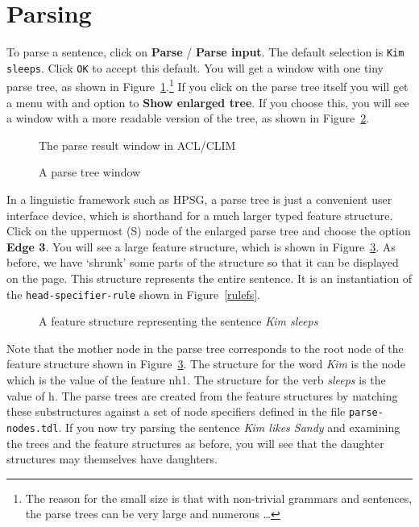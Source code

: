 \documentclass[12pt]{report}
\begin{document}
\section{Parsing}

To parse a sentence, click on {\bf Parse} / {\bf Parse input}.
The default selection is {\tt Kim sleeps}.  Click {\tt OK} to
accept this default. You will get a window with one tiny parse
tree, as shown in Figure~\ref{kimsleeps}.\footnote{The reason for the
small size is that with non-trivial grammars and sentences, the parse 
trees can be very large and numerous \ldots} If you click on the parse
tree itself you will get a menu with and option to {\bf Show enlarged tree}.
If you choose this, you will see a window with a more readable version
of the tree, as shown in Figure~\ref{ptree}.
\begin{figure}
\epsfxsize=2in
\caption{The parse result window in ACL/CLIM}
\label{kimsleeps}
\end{figure}
\begin{figure}
\epsfxsize=2in
\caption{A parse tree window}
\label{ptree}
\end{figure}

In a linguistic framework such as HPSG, a parse tree is just a convenient
user interface device, which is shorthand for a much larger typed
feature structure.  Click on the uppermost (S) node of the
enlarged parse tree and choose the option {\bf Edge 3}.  You will
see a large feature structure, which is shown in Figure~\ref{bigfs}.
As before, we have `shrunk' some parts of the structure so that
it can be displayed on the page.
This structure represents the entire
sentence.  It is an instantiation of the {\tt head-specifier-rule}
shown in Figure~\ref{rulefs}.
\begin{figure}
\epsfxsize=4in
\caption{A feature structure representing the sentence {\it Kim sleeps}}
\label{bigfs}
\end{figure}

Note that the mother node in the parse tree corresponds
to the root node of the feature structure shown in Figure~\ref{bigfs}.
The structure for the word {\it Kim} is the node which
is the value of the feature {\sc nh1}.  The structure for the
verb {\it sleeps} is the value of {\sc h}.
The parse trees are created from the feature structures
by matching these substructures against a set of node specifiers
defined in the file {\tt parse-nodes.tdl}.
If you now try parsing the sentence {\it Kim likes Sandy}
and examining the trees and the feature structures as before, you
will see that the daughter structures may themselves have daughters.
\end{document}
